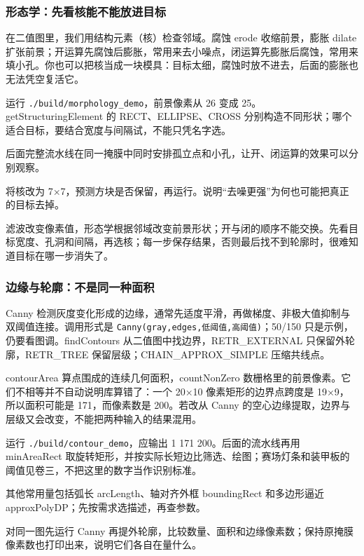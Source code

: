 \subsubsection{形态学：先看核能不能放进目标}
在二值图里，我们用结构元素（核）检查邻域。腐蚀 erode 收缩前景，膨胀 dilate 扩张前景；开运算先腐蚀后膨胀，常用来去小噪点，闭运算先膨胀后腐蚀，常用来填小孔。你也可以把核当成一块模具：目标太细，腐蚀时放不进去，后面的膨胀也无法凭空复活它。
\begin{example}
运行 \texttt{./build/morphology\_demo}，前景像素从 26 变成 25。getStructuringElement 的 RECT、ELLIPSE、CROSS 分别构造不同形状；哪个适合目标，要结合宽度与间隔试，不能只凭名字选。
\begin{cvblock}

\end{cvblock}
后面完整流水线在同一掩膜中同时安排孤立点和小孔，让开、闭运算的效果可以分别观察。
\end{example}
\begin{exercise}\label{ex:v2-cv-morphology}
将核改为 7×7，预测方块是否保留，再运行。说明“去噪更强”为何也可能把真正的目标去掉。
\end{exercise}
\begin{conclusion}
滤波改变像素值，形态学根据邻域改变前景形状；开与闭的顺序不能交换。先看目标宽度、孔洞和间隔，再选核；每一步保存结果，否则最后找不到轮廓时，很难知道目标在哪一步消失了。
\end{conclusion}

\subsubsection{边缘与轮廓：不是同一种面积}
Canny 检测灰度变化形成的边缘，通常先适度平滑，再做梯度、非极大值抑制与双阈值连接。调用形式是 \texttt{Canny(gray,edges,低阈值,高阈值)}；50/150 只是示例，仍要看图调。findContours 从二值图中找边界，RETR\_EXTERNAL 只保留外轮廓，RETR\_TREE 保留层级；CHAIN\_APPROX\_SIMPLE 压缩共线点。

contourArea 算点围成的连续几何面积，countNonZero 数栅格里的前景像素。它们不相等并不自动说明库算错了：一个 20×10 像素矩形的边界点跨度是 19×9，所以面积可能是 171，而像素数是 200。若改从 Canny 的空心边缘提取，边界与层级又会改变，不能把两种输入的结果混用。
\begin{example}[先用一块矩形核对几何量]
运行 \texttt{./build/contour\_demo}，应输出 1 171 200。后面的流水线再用 minAreaRect 取旋转矩形，并按实际长短边比筛选、绘图；赛场灯条和装甲板的阈值见卷三，不把这里的数字当作识别标准。
\begin{cvblock}

\end{cvblock}
其他常用量包括弧长 arcLength、轴对齐外框 boundingRect 和多边形逼近 approxPolyDP；先按需求选描述，再查参数。
\end{example}
\begin{exercise}\label{ex:v2-cv-contour}
对同一图先运行 Canny 再提外轮廓，比较数量、面积和边缘像素数；保持原掩膜像素数也打印出来，说明它们各自在量什么。
\end{exercise}

